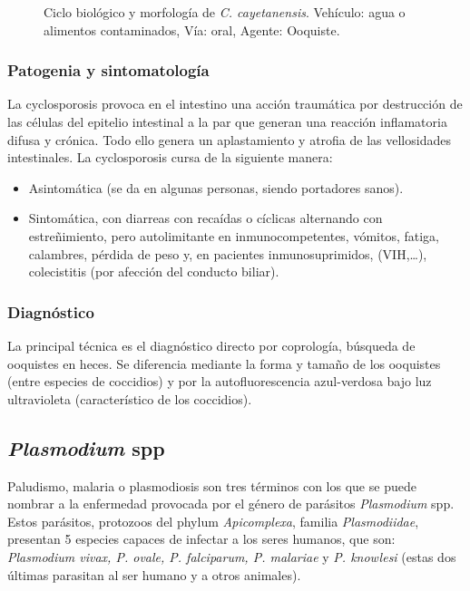 \begin{multicols}{2}
\begin{figure}[H]
		\caption[Ciclo biológico y morfología de \textit{C. cayetanensis}]{Ciclo biológico y morfología de \textit{C. cayetanensis}. Vehículo: agua o alimentos contaminados, Vía: oral, Agente: Ooquiste.\label{fig:PARASIT:CcayetanesisMorf}}
	\end{figure}
\end{multicols}
\subsubsection{Patogenia y sintomatología}
La cyclosporosis provoca en el intestino una acción traumática por destrucción de las células del epitelio intestinal a la par que generan una reacción inflamatoria difusa y crónica. Todo ello genera un aplastamiento y atrofia de las vellosidades intestinales. La cyclosporosis cursa de la siguiente manera:
\begin{itemize}[itemsep=0pt,parsep=0pt,topsep=0pt,partopsep=0pt]
	\item Asintomática (se da en algunas personas, siendo portadores sanos).
	\item Sintomática, con diarreas con recaídas o cíclicas alternando con estreñimiento, pero autolimitante en inmunocompetentes, vómitos, fatiga, calambres, pérdida de peso y, en pacientes inmunosuprimidos, (VIH,…), colecistitis (por afección del conducto biliar).
\end{itemize}
\subsubsection{Diagnóstico}
La principal técnica es el diagnóstico directo por coprología, búsqueda de ooquistes en heces. Se diferencia mediante la forma y tamaño de los ooquistes (entre especies de coccidios) y por la autofluorescencia azul-verdosa bajo luz ultravioleta (característico de los coccidios).
\newpage
\subsection{\textit{Plasmodium} spp}
Paludismo, malaria o plasmodiosis son tres términos con los que se puede nombrar a la enfermedad provocada por el género de parásitos \textit{Plasmodium} spp. Estos parásitos, protozoos del phylum \textit{Apicomplexa}, familia \textit{Plasmodiidae}, presentan 5 especies capaces de infectar a los seres humanos, que son: \textit{Plasmodium vivax, P. ovale, P. falciparum, P. malariae} y \textit{P. knowlesi} (estas dos últimas parasitan al ser humano y a otros animales).
